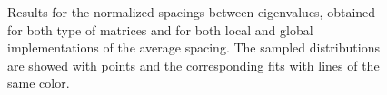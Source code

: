\documentclass[pra, onecolumn, notitlepage, floats, 11pt]{revtex4-1}
\begin{document}
\begin{figure}[!h]
    \centering
    \hfill
    \caption{Results for the normalized spacings between eigenvalues, obtained for both type of matrices and for both local and global implementations of the average spacing. The sampled distributions are showed with points and the corresponding fits with lines of the same color.}
\end{figure}
\end{document}
